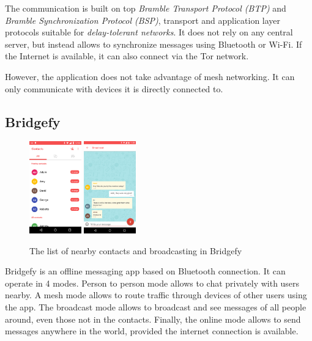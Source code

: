 \documentclass[conference,compsoc]{IEEEtran}
\begin{document}
The communication is built on top \textit{Bramble Transport Protocol (BTP)} and \textit{Bramble Synchronization Protocol (BSP)}, transport and application layer protocols suitable for \textit{delay-tolerant networks}. \cite{briar_stack} It does not rely on any central server, but instead allows to synchronize messages using Bluetooth or Wi-Fi. If the Internet is available, it can also connect via the Tor network.

However, the application does not take advantage of mesh networking. It can only communicate with devices it is directly connected to.

\subsection{Bridgefy}

\begin{figure}[h]
  \centering
  \includegraphics[width=0.2\textwidth]{bridgefy1}
  \includegraphics[width=0.2\textwidth]{bridgefy2}
  \caption{The list of nearby contacts and broadcasting in Bridgefy \cite{bridgefy_gplay}}
\end{figure}

Bridgefy is an offline messaging app based on Bluetooth connection. It can operate in 4 modes. Person to person mode allows to chat privately with users nearby. A mesh mode allows to route traffic through devices of other users using the app. The broadcast mode allows to broadcast and see messages of all people around, even those not in the contacts. Finally, the online mode allows to send messages anywhere in the world, provided the internet connection is available.
\end{document}
